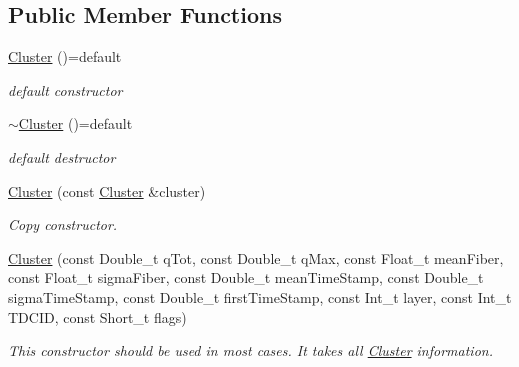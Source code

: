 \subsection*{Public Member Functions}
\begin{DoxyCompactItemize}
\item 
\mbox{\label{classCluster_a115edd51ef79406194cfa10ad5f44688}} 
\hyperlink{classCluster_a115edd51ef79406194cfa10ad5f44688}{Cluster} ()=default
\begin{DoxyCompactList}\small\item\em default constructor \end{DoxyCompactList}\item 
\mbox{\label{classCluster_a0dae97c5173ed13d405a8cf5b03dc497}} 
\hyperlink{classCluster_a0dae97c5173ed13d405a8cf5b03dc497}{$\sim$\+Cluster} ()=default
\begin{DoxyCompactList}\small\item\em default destructor \end{DoxyCompactList}\item 
\mbox{\label{classCluster_aee67361b05ff006a0a90e87c712cc338}} 
\hyperlink{classCluster_aee67361b05ff006a0a90e87c712cc338}{Cluster} (const \hyperlink{classCluster}{Cluster} \&cluster)
\begin{DoxyCompactList}\small\item\em Copy constructor. \end{DoxyCompactList}\item 
\mbox{\label{classCluster_a64840fa60acf13c89406a38c1475014c}} 
\hyperlink{classCluster_a64840fa60acf13c89406a38c1475014c}{Cluster} (const Double\+\_\+t q\+Tot, const Double\+\_\+t q\+Max, const Float\+\_\+t mean\+Fiber, const Float\+\_\+t sigma\+Fiber, const Double\+\_\+t mean\+Time\+Stamp, const Double\+\_\+t sigma\+Time\+Stamp, const Double\+\_\+t first\+Time\+Stamp, const Int\+\_\+t layer, const Int\+\_\+t T\+D\+C\+ID, const Short\+\_\+t flags)
\begin{DoxyCompactList}\small\item\em This constructor should be used in most cases. It takes all \hyperlink{classCluster}{Cluster} information. \end{DoxyCompactList}\item 
\mbox{\label{classCluster_a3fb10af0d537659bc85844087dbdb5d2}} 

\end{DoxyCompactItemize}
